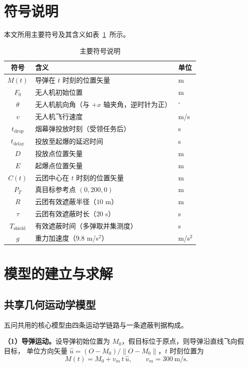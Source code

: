 \documentclass[12pt, a4paper]{article}
\begin{document}
\section{符号说明}

本文所用主要符号及其含义如表~\ref{tab:symbols}~所示。

\begin{table}[H]
\centering
\caption{主要符号说明}
\label{tab:symbols}
\begin{tabular}{cll}
\toprule
\textbf{符号} & \textbf{含义} & \textbf{单位} \\
\midrule
$M(t)$  & 导弹在 $t$ 时刻的位置矢量 & m \\
$F_0$   & 无人机初始位置 & m \\
$\theta$ & 无人机航向角（与 $+x$ 轴夹角，逆时针为正） & ${}^{\circ}$ \\
$v$     & 无人机飞行速度 & m/s \\
$t_{\mathrm{drop}}$ & 烟幕弹投放时刻（受领任务后） & s \\
$t_{\mathrm{delay}}$ & 投放至起爆的延迟时间 & s \\
$D$     & 投放点位置矢量 & m \\
$E$     & 起爆点位置矢量 & m \\
$C(t)$  & 云团中心在 $t$ 时刻的位置矢量 & m \\
$P_T$   & 真目标参考点 $(0,200,0)$ & m \\
$R$     & 云团有效遮蔽半径（$10$ m） & m \\
$\tau$  & 云团有效遮蔽时长（$20$ s） & s \\
$T_{\mathrm{shield}}$ & 有效遮蔽时间（多弹取并集测度） & s \\
$g$     & 重力加速度（$9.8$ m/s$^2$） & m/s$^2$ \\
\bottomrule
\end{tabular}
\end{table}
\section{模型的建立与求解}

\subsection{共享几何运动学模型}

五问共用的核心模型由四条运动学链路与一条遮蔽判据构成。

\textbf{（1）导弹运动。}设导弹初始位置为 $M_0$，假目标位于原点，则导弹沿直线飞向假目标，
单位方向矢量 $\hat{u}=(O-M_0)/\|O-M_0\|$，$t$ 时刻位置为
\begin{equation}
    M(t) = M_0 + v_m\, t\, \hat{u},\qquad v_m = 300\ \text{m/s}.
    \label{eq:missile}
\end{equation}
\end{document}
